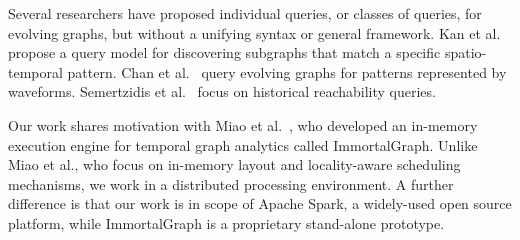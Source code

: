 Several researchers have proposed individual queries, or classes of
queries, for evolving graphs, but without a unifying syntax or general
framework.  Kan et al.~\cite{Kan2009} propose a query model for
discovering subgraphs that match a specific spatio-temporal pattern.
Chan et al.~\cite{Chan2008} query evolving graphs for patterns
represented by waveforms.  Semertzidis et al.~\cite{Semertzidis2015}
focus on historical reachability queries.

Our work shares motivation with Miao et
al.~\cite{DBLP:journals/tos/MiaoHLWYZPCC15}, who developed an
in-memory execution engine for temporal graph analytics called
ImmortalGraph.  Unlike Miao et al., who focus on in-memory layout and
locality-aware scheduling mechanisms, we work in a distributed
processing environment.  A further difference is that our work is in
scope of Apache Spark, a widely-used open source platform, while
ImmortalGraph is a proprietary stand-alone prototype.

